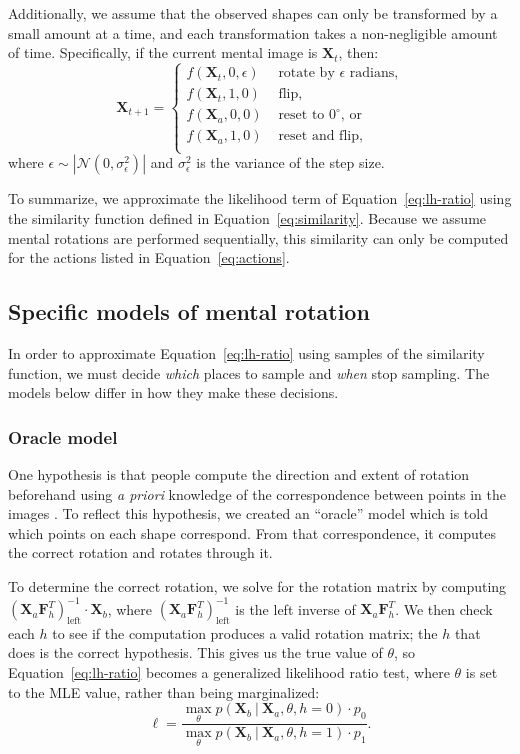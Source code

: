 \documentclass[10pt,letterpaper]{article}
\newcommand{\Xa}[0]{\mathbf{X}_a}
\newcommand{\Xb}[0]{\mathbf{X}_b}
\newcommand{\Xt}[0]{\mathbf{X}_t}
\newcommand{\F}[0]{\mathbf{F}}
\newcommand{\hi}[0]{h=0}
\newcommand{\hf}[0]{h=1}
\begin{document}
Additionally, we assume that the observed shapes can only be
transformed by a small amount at a time, and each transformation takes
a non-negligible amount of time. Specifically, if the current mental
image is $\Xt$, then:
\begin{equation}
  \mathbf{X}_{t+1} = \left\{ \begin{array}{ll}
      f(\Xt, 0, \epsilon) &\mbox{ rotate by $\epsilon$ radians,} \\
      f(\Xt, 1, 0) &\mbox{ flip,} \\
      f(\Xa, 0, 0) &\mbox{ reset to $0^\circ$, or} \\
      f(\Xa, 1, 0) &\mbox{ reset and flip,} \\
    \end{array} \right.
  \label{eq:actions}
\end{equation}
where $\epsilon\sim \left|\mathcal{N}(0, \sigma_\epsilon^2)\right|$
and $\sigma_\epsilon^2$ is the variance of the step size.

To summarize, we approximate the likelihood term of
Equation~\ref{eq:lh-ratio} using the similarity function defined in
Equation~\ref{eq:similarity}. Because we assume mental rotations are
performed sequentially, this similarity can only be computed for the
actions listed in Equation~\ref{eq:actions}.

\subsection{Specific models of mental rotation}

In order to approximate Equation~\ref{eq:lh-ratio} using samples of
the similarity function, we must decide \textit{which} places to
sample and \textit{when} stop sampling. The models below differ in how
they make these decisions.

\subsubsection{Oracle model}

One hypothesis is that people compute the direction and extent of
rotation beforehand using \textit{a priori} knowledge of the
correspondence between points in the images
\cite{Funt:1983wn,Just:1985uu}.  To reflect this hypothesis, we
created an ``oracle'' model which is told which points on each shape
correspond. From that correspondence, it computes the correct rotation
and rotates through it.

To determine the correct rotation, we solve for the rotation matrix by
computing $(\Xa \F_h^T)_\mathrm{left}^{-1}\cdot{}\Xb$, where
$(\Xa\F_h^T)_\mathrm{left}^{-1}$ is the left inverse of
$\Xa\F_h^T$. We then check each $h$ to see if the computation produces
a valid rotation matrix; the $h$ that does is the correct
hypothesis. This gives us the true value of $\theta$, so
Equation~\ref{eq:lh-ratio} becomes a generalized likelihood ratio
test, where $\theta$ is set to the MLE value, rather than being
marginalized:
\begin{equation}
  \ell = \frac{\max_\theta p(\Xb\ \vert\ \Xa, \theta, \hi)\cdot{}p_0}{\max_\theta p(\Xb\ \vert\ \Xa, \theta, \hf)\cdot{}p_1}.
  \label{eq:mle-lh-ratio}
\end{equation}
\end{document}
